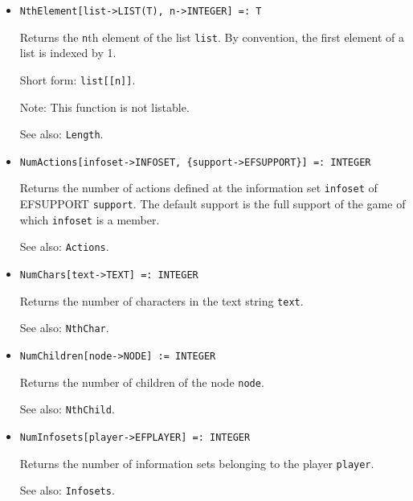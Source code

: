 \begin{itemize}
\item
\protect \large \begin{verbatim}
NthElement[list->LIST(T), n->INTEGER] =: T 
\end{verbatim}\normalsize

\bd
Returns the \verb+n+th element of the list \verb+list+.
By convention, the first element of a list is indexed by 1.
\item
[Short form:] \verb+list[[n]]+.
\item
[Note:] This function is not listable.
\item
[See also:] {\tt Length}.
\ed

\item
\protect \large \begin{verbatim}
NumActions[infoset->INFOSET, {support->EFSUPPORT}] =: INTEGER
\end{verbatim}\normalsize

\bd
Returns the number of actions defined at the information
set \verb+infoset+ of EFSUPPORT \verb+support+.  The default support
is the full support of the game of which \verb+infoset+ is a member.  
\item
[See also:] {\tt Actions}.
\ed

\item
\protect \large \begin{verbatim}
NumChars[text->TEXT] =: INTEGER
\end{verbatim}\normalsize

\bd
Returns the number of characters in the text string
\verb+text+.
\item
[See also:] {\tt NthChar}.
\ed

\item
\protect \large \begin{verbatim}
NumChildren[node->NODE] := INTEGER
\end{verbatim}\normalsize

\bd
Returns the number of children of the node \verb+node+.
\item
[See also:] {\tt NthChild}.
\ed

\item
\protect \large \begin{verbatim}
NumInfosets[player->EFPLAYER] =: INTEGER
\end{verbatim}\normalsize

\bd
Returns the number of information sets belonging to the
player \verb+player+.
\item
[See also:] {\tt Infosets}.
\ed


\end{itemize}
